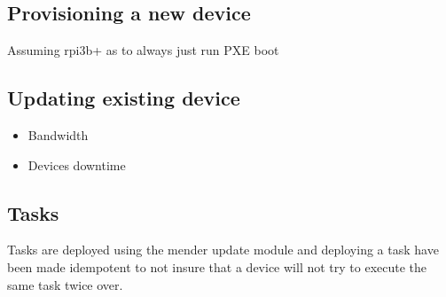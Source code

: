 \documentclass[../../main.tex]{subfiles}
\begin{document}
\subsection{Provisioning a new device}%
\label{sub:provisioning_a_new_device}
Assuming rpi3b+ as to always just run PXE boot

\subsection{Updating existing device}%
\label{sub:updating_existing_device}

\begin{itemize}
	\item Bandwidth
	\item Devices downtime
\end{itemize}

\subsection{Tasks}%
\label{sub:tasks}

Tasks are deployed using the mender update module and deploying a task have been made idempotent
to not insure that a device will not try to execute the same task twice over.




	
\end{document}
